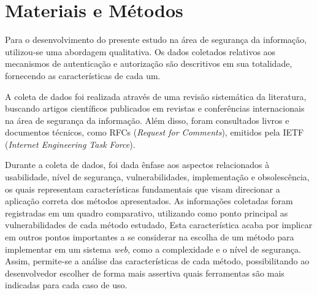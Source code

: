 \section{Materiais e Métodos}

Para o desenvolvimento do presente estudo na área de segurança da informação, utilizou-se uma 
abordagem qualitativa. Os dados coletados relativos aos mecanismos de autenticação e autorização 
são descritivos em sua totalidade, fornecendo as características de cada um.

A coleta de dados foi realizada através de uma revisão sistemática da literatura, buscando artigos 
científicos publicados em revistas e conferências internacionais na área de segurança da informação.
Além disso, foram consultados livros e documentos técnicos, como RFCs 
(\emph{Request for Comments}), emitidos pela IETF (\emph{Internet Engineering Task Force}).

Durante a coleta de dados, foi dada ênfase aos aspectos relacionados à usabilidade, nível de 
segurança, vulnerabilidades, implementação e obsolescência, os quais representam características 
fundamentais que visam direcionar a aplicação correta dos métodos apresentados. As informações 
coletadas foram registradas em um quadro comparativo, utilizando como ponto principal as 
vulnerabilidades de cada método estudado, Esta característica acaba por implicar em 
outros pontos importantes a se considerar na escolha de um método para implementar em 
um sistema \emph{web}, como a complexidade e o nível de segurança. Assim, permite-se a 
análise das características de cada método, possibilitando ao desenvolvedor escolher de forma mais 
assertiva quais ferramentas são mais indicadas para cada caso de uso.



